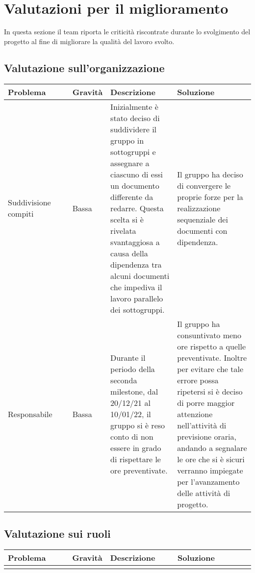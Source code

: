 \chapter{Valutazioni per il miglioramento}
In questa sezione il team riporta le criticità riscontrate durante
 lo svolgimento del progetto al fine di migliorare la qualità del
 lavoro svolto.

\section{Valutazione sull'organizzazione}
\begin{table}[H]
    \centering
    \begin{tabular}{|p{0.27\linewidth}|p{0.11\linewidth}|p{0.29\linewidth}|p{0.33\linewidth}|}
    \hline
    \rowcolor[HTML]{036400}
    {\color[HTML]{FFFFFF} \textbf{Problema}} & {\color[HTML]{FFFFFF} \textbf{Gravità}} & {\color[HTML]{FFFFFF} \textbf{Descrizione}} & {\color[HTML]{FFFFFF} \textbf{Soluzione}} \\ \hline
    \rowcolor[HTML]{EFEFEF}
    Suddivisione compiti& Bassa & Inizialmente è stato deciso di suddividere il gruppo in sottogruppi e assegnare a ciascuno di essi un documento differente da redarre. Questa scelta si è rivelata svantaggiosa a causa della dipendenza tra alcuni documenti che impediva il lavoro parallelo dei sottogruppi. & Il gruppo ha deciso di convergere le proprie forze per la realizzazione sequenziale dei documenti con dipendenza. \\ \hline
    \rowcolor[HTML]{C0C0C0}
    Responsabile&Bassa  &Durante il periodo della seconda milestone, dal 20/12/21 al 10/01/22, il gruppo si è reso conto di non essere in grado di rispettare le ore preventivate. &Il gruppo ha consuntivato meno ore rispetto a quelle preventivate. Inoltre per evitare che tale errore possa ripetersi si è deciso di porre maggior attenzione nell'attività di previsione oraria, andando a segnalare le ore che si è sicuri verranno impiegate per l'avanzamento delle attività di progetto.  \\ \hline
    \end{tabular}
\end{table}



\section{Valutazione sui ruoli}
\begin{table}[H]
    \centering
    \begin{tabular}{|p{0.27\linewidth}|p{0.11\linewidth}|p{0.29\linewidth}|p{0.33\linewidth}|}
    \hline
    \rowcolor[HTML]{036400}
    {\color[HTML]{FFFFFF} \textbf{Problema}} & {\color[HTML]{FFFFFF} \textbf{Gravità}} & {\color[HTML]{FFFFFF} \textbf{Descrizione}} & {\color[HTML]{FFFFFF} \textbf{Soluzione}} \\ \hline
    \rowcolor[HTML]{EFEFEF}
    &  & & \\ \hline
    \end{tabular}
\end{table}


